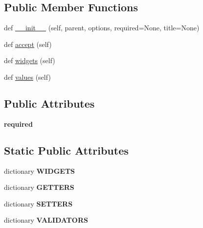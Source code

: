 \subsection*{Public Member Functions}
\begin{DoxyCompactItemize}
\item 
def \mbox{\hyperlink{class_dsg_tools_1_1_validation_tools_1_1process_parameters_dialog_1_1_process_parameters_dialog_a94265b4a7627facd459b61ef29306383}{\+\_\+\+\_\+init\+\_\+\+\_\+}} (self, parent, options, required=None, title=None)
\item 
def \mbox{\hyperlink{class_dsg_tools_1_1_validation_tools_1_1process_parameters_dialog_1_1_process_parameters_dialog_af98151fb4552234e3d92e0e4b4bdea73}{accept}} (self)
\item 
def \mbox{\hyperlink{class_dsg_tools_1_1_validation_tools_1_1process_parameters_dialog_1_1_process_parameters_dialog_a6c52b36fdddcbcc1d35597bd5bfc0ff3}{widgets}} (self)
\item 
def \mbox{\hyperlink{class_dsg_tools_1_1_validation_tools_1_1process_parameters_dialog_1_1_process_parameters_dialog_ac16e1fb8ce02551da4ccb5bcc632f63b}{values}} (self)
\end{DoxyCompactItemize}
\subsection*{Public Attributes}
\begin{DoxyCompactItemize}
\item 
\mbox{\label{class_dsg_tools_1_1_validation_tools_1_1process_parameters_dialog_1_1_process_parameters_dialog_a82f10c1bd247671ec26f2dae892ef100}} 
{\bfseries required}
\end{DoxyCompactItemize}
\subsection*{Static Public Attributes}
\begin{DoxyCompactItemize}
\item 
dictionary {\bfseries W\+I\+D\+G\+E\+TS}
\item 
dictionary {\bfseries G\+E\+T\+T\+E\+RS}
\item 
dictionary {\bfseries S\+E\+T\+T\+E\+RS}
\item 
dictionary {\bfseries V\+A\+L\+I\+D\+A\+T\+O\+RS}
\end{DoxyCompactItemize}


